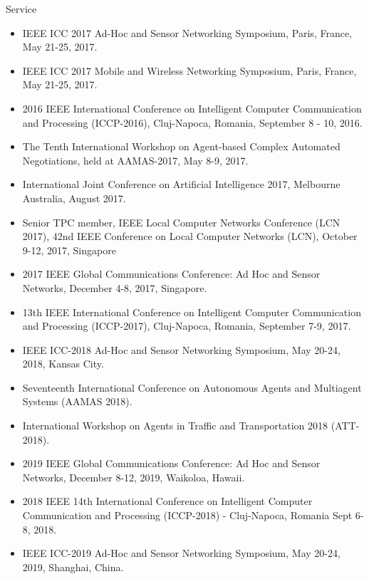 \begin{category}{Service}
\begin{itemize}
\item IEEE ICC 2017 Ad-Hoc and Sensor Networking Symposium, Paris, France, May 21-25, 2017.

\item IEEE ICC 2017 Mobile and Wireless Networking Symposium, Paris, France, May 21-25, 2017.

\item 2016 IEEE International Conference on Intelligent
Computer Communication and Processing (ICCP-2016), Cluj-Napoca, Romania, September 8 - 10, 2016.

\item The Tenth International Workshop on Agent-based Complex Automated Negotiations, held at AAMAS-2017, May 8-9, 2017.
\item  International Joint Conference on Artificial Intelligence 2017, Melbourne Australia, August 2017.

\item Senior TPC member, IEEE Local Computer Networks Conference (LCN 2017), 42nd IEEE Conference on Local Computer Networks (LCN), October 9-12, 2017, Singapore

\item 2017 IEEE Global Communications Conference: Ad Hoc and Sensor Networks, December 4-8, 2017, Singapore.

\item 13th IEEE International Conference on Intelligent
Computer Communication and Processing (ICCP-2017), Cluj-Napoca, Romania, September 7-9, 2017.

\item IEEE ICC-2018 Ad-Hoc and Sensor Networking Symposium, May 20-24, 2018, Kansas City.

\item Seventeenth International Conference on Autonomous Agents and Multiagent Systems (AAMAS 2018).

\item International Workshop on Agents in Traffic and Transportation
2018 (ATT-2018).

\item  2019 IEEE Global Communications Conference: Ad Hoc and Sensor Networks, December 8-12, 2019, Waikoloa, Hawaii.

\item 2018 IEEE 14th International Conference on Intelligent Computer
Communication and Processing (ICCP-2018) - Cluj-Napoca, Romania Sept 6-8, 2018.

\item IEEE ICC-2019 Ad-Hoc and Sensor Networking Symposium, May 20-24, 2019, Shanghai, China.


\end{itemize}
\end{category}

